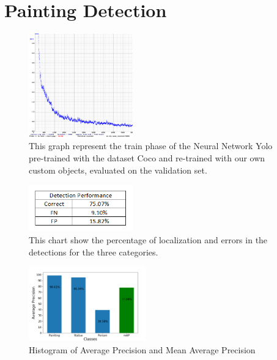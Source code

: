\section{Painting Detection}

\begin{figure}
    \centering
        \includegraphics[width=0.4\textwidth]{pictures/painting_detection/chart_.png}
    \caption{This graph represent the train phase of the Neural Network Yolo pre-trained with the dataset Coco and re-trained with our own custom objects, evaluated on the validation set.}
    \label{fig:figura1}
\end{figure}

\begin{figure}
    \centering
        \includegraphics[width=0.4\textwidth]{pictures/painting_detection/tabella1_.png}
    \caption{This chart show the percentage of localization and  errors in the detections for the three categories.}
    \label{fig:figura2}
\end{figure}

\begin{figure}[h] 
    \centering
        \includegraphics[width=0.45\textwidth]{pictures/painting_detection/performance2.png}
    \caption{Histogram of Average Precision and Mean Average Precision}
    \label{fig:figura3}
\end{figure} 


